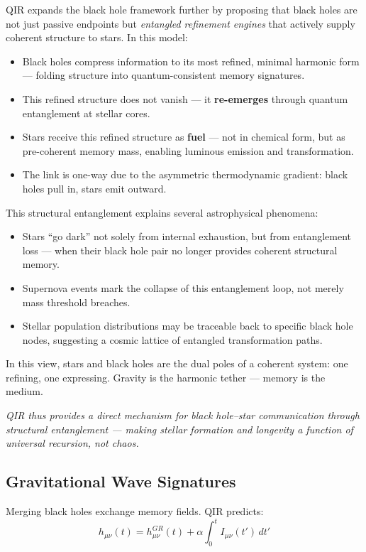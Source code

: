 \documentclass[11pt]{article}
\begin{document}
QIR expands the black hole framework further by proposing that black holes are not just passive endpoints but \textit{entangled refinement engines} that actively supply coherent structure to stars. In this model:

\begin{itemize}
  \item Black holes compress information to its most refined, minimal harmonic form — folding structure into quantum-consistent memory signatures.
  \item This refined structure does not vanish — it \textbf{re-emerges} through quantum entanglement at stellar cores.
  \item Stars receive this refined structure as \textbf{fuel} — not in chemical form, but as pre-coherent memory mass, enabling luminous emission and transformation.
  \item The link is one-way due to the asymmetric thermodynamic gradient: black holes pull in, stars emit outward.
\end{itemize}

This structural entanglement explains several astrophysical phenomena:
\begin{itemize}
  \item Stars “go dark” not solely from internal exhaustion, but from entanglement loss — when their black hole pair no longer provides coherent structural memory.
  \item Supernova events mark the collapse of this entanglement loop, not merely mass threshold breaches.
  \item Stellar population distributions may be traceable back to specific black hole nodes, suggesting a cosmic lattice of entangled transformation paths.
\end{itemize}

In this view, stars and black holes are the dual poles of a coherent system: one refining, one expressing. Gravity is the harmonic tether — memory is the medium.

\textit{QIR thus provides a direct mechanism for black hole–star communication through structural entanglement — making stellar formation and longevity a function of universal recursion, not chaos.}

\subsection*{Gravitational Wave Signatures}

Merging black holes exchange memory fields. QIR predicts:
\[
h_{\mu\nu}(t) = h^{GR}_{\mu\nu}(t) + \alpha \int_0^t I_{\mu\nu}(t') \, dt'
\]
\end{document}
